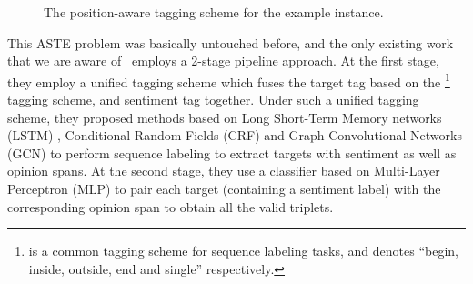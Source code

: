 \documentclass[11pt,a4paper]{article}
\begin{document}
\begin{figure*}[t!]
{ 
		}		\caption{The position-aware tagging scheme for the example instance.}
\label{fig:structure}
	\end{figure*}























This ASTE problem was basically untouched before, and the only existing work that we are aware of~\cite{peng2019knowing} employs a 2-stage pipeline approach.
At the first stage, they employ a unified tagging scheme which fuses the target tag based on the \footnote{ is a common tagging scheme for sequence labeling tasks, and  denotes ``begin, inside, outside, end and single'' respectively.} tagging scheme, and sentiment tag together.
Under such a unified tagging scheme, they proposed methods based on Long Short-Term Memory networks (LSTM) \cite{lstm97}, Conditional Random Fields (CRF) \cite{lafferty2001conditional} and Graph Convolutional Networks (GCN) \cite{kipf2017semi} to perform sequence labeling to extract targets with sentiment as well as opinion spans.
At the second stage, they use a classifier based on Multi-Layer Perceptron (MLP) to pair each target (containing a sentiment label) with the corresponding opinion span to obtain all the valid triplets. 
\end{document}
